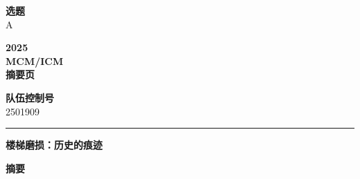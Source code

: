 \documentclass[11pt,a4paper]{ctexart}
\begin{document}
\thispagestyle{empty}

\noindent
\begin{minipage}[t]{0.30\textwidth}\centering
  {\small\bfseries 选题}\\[3pt] {\Large A}
\end{minipage}%
\begin{minipage}[t]{0.36\textwidth}\centering
  {\small\bfseries 2025}\\[3pt] {\small\bfseries MCM/ICM}\\[2pt] {\small\bfseries 摘要页}
\end{minipage}%
\begin{minipage}[t]{0.30\textwidth}\centering
  {\small\bfseries 队伍控制号}\\[3pt] {\Large 2501909}
\end{minipage}

\vspace{4pt}
\noindent\rule{\textwidth}{1pt}

\vspace{10pt}
\begin{center}
{\LARGE\bfseries 楼梯磨损：历史的痕迹}
\end{center}

\vspace{6pt}
\begin{center}
{\large\bfseries 摘要}
\end{center}
\end{document}

